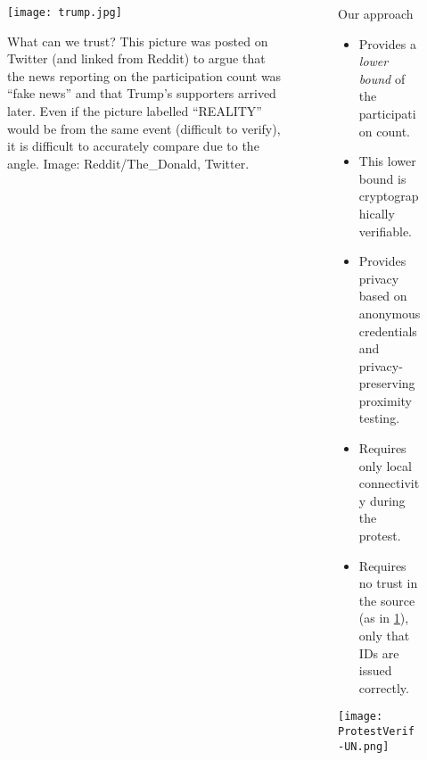 \begin{columns}[t]
  \hfill

  \begin{column}{0.32\linewidth}

    \begin{figure}
      \centering
      \texttt{[image: trump.jpg]}
      \caption{%
        What can we trust?
        This picture was posted on Twitter (and linked from Reddit) to argue 
        that the news reporting on the participation count was \enquote{fake 
          news} and that Trump's supporters arrived later.
        Even if the picture labelled \enquote{REALITY} would be from the same 
        event (difficult to verify), it is difficult to accurately compare due 
        to the angle.
        Image: Reddit/The\_Donald, Twitter.
      }\label{TrumpInauguration}
    \end{figure}

  \end{column}

  \hfill

  \begin{column}{0.32\linewidth}

    \begin{greenblock}{Our approach}
      \begin{itemize}
        \item Provides a \emph{lower bound} of the participation count.
        \item This lower bound is cryptographically verifiable.
        \item Provides privacy based on anonymous credentials and 
          privacy-preserving proximity testing.
        \item Requires only local connectivity during the protest.
        \item Requires no trust in the source (as in \cref{TrumpInauguration}), 
          only that IDs are issued correctly.
      \end{itemize}
    \end{greenblock}

    \texttt{[image: ProtestVerif-UN.png]}

  \end{column}

\end{columns}

\vfill


